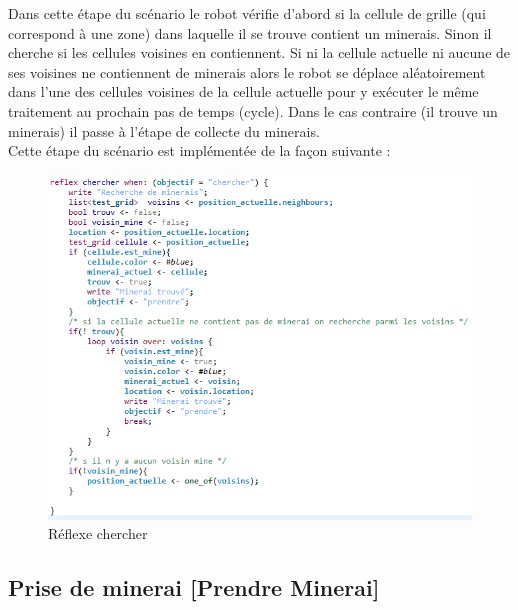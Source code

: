 Dans cette étape du scénario le robot vérifie d'abord si la cellule de grille (qui correspond à une zone) dans laquelle 
il se trouve contient un minerais. Sinon il cherche si les cellules voisines en contiennent. Si ni la cellule actuelle ni aucune de ses voisines ne contiennent de minerais alors le robot se déplace aléatoirement dans l'une des cellules voisines de la cellule actuelle pour y exécuter le même traitement au prochain pas de temps (cycle). Dans le cas contraire (il trouve un minerais) il passe à l'étape de collecte du minerais. \\
Cette étape du scénario est implémentée de la façon suivante : 
\begin{figure}[!h]
	\begin{center}
		\includegraphics{code/chercher}
	\end{center}
	\caption{Réflexe chercher}
\end{figure}

\subsection{Prise de minerai [Prendre Minerai]}

